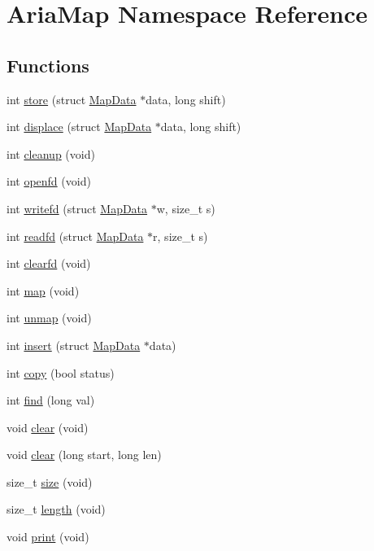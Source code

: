 \hypertarget{namespaceAriaMap}{}\section{Aria\+Map Namespace Reference}
\label{namespaceAriaMap}
\subsection*{Functions}
\begin{DoxyCompactItemize}
\item 
int \hyperlink{namespaceAriaMap_ab476269022f8048bbb7618a4830eeabd}{store} (struct \hyperlink{structMapData}{Map\+Data} $\ast$data, long shift)
\item 
int \hyperlink{namespaceAriaMap_aad25e1bc6cbd702fd569df804d90e464}{displace} (struct \hyperlink{structMapData}{Map\+Data} $\ast$data, long shift)
\item 
int \hyperlink{namespaceAriaMap_a0820778a918ad835c8b7b9dbd2b0ae9e}{cleanup} (void)
\item 
int \hyperlink{namespaceAriaMap_a7775ad4992d7a25a554896bc3ed5e4ce}{openfd} (void)
\item 
int \hyperlink{namespaceAriaMap_ae9ed69be092b57caff848ae611339adf}{writefd} (struct \hyperlink{structMapData}{Map\+Data} $\ast$w, size\+\_\+t s)
\item 
int \hyperlink{namespaceAriaMap_a85b66efeb9b3e717ea5c8ee3f72bec1a}{readfd} (struct \hyperlink{structMapData}{Map\+Data} $\ast$r, size\+\_\+t s)
\item 
int \hyperlink{namespaceAriaMap_a4f96bec0326c57c4fb11595fb5e48e52}{clearfd} (void)
\item 
int \hyperlink{namespaceAriaMap_a16dcceca67f06165428001241996ab14}{map} (void)
\item 
int \hyperlink{namespaceAriaMap_a05e8b260d9c410e0dec752d41e22dd98}{unmap} (void)
\item 
int \hyperlink{namespaceAriaMap_abde04797d8f7dca3a40b492d7e7788a6}{insert} (struct \hyperlink{structMapData}{Map\+Data} $\ast$data)
\item 
int \hyperlink{namespaceAriaMap_af2742e0765093c4fc620caaaa76c38bc}{copy} (bool status)
\item 
int \hyperlink{namespaceAriaMap_a9d3f96512f5841571994008631b27b48}{find} (long val)
\item 
void \hyperlink{namespaceAriaMap_a1ae3654679044db830871fa3b0d409f1}{clear} (void)
\item 
void \hyperlink{namespaceAriaMap_a16bcb7ece1c6912d7372d15f38b8057e}{clear} (long start, long len)
\item 
size\+\_\+t \hyperlink{namespaceAriaMap_a6e02547a1c5f23b8b520faaf4ac435d5}{size} (void)
\item 
size\+\_\+t \hyperlink{namespaceAriaMap_a234dc58cf6e47d321f7a9743fd2635ec}{length} (void)
\item 
void \hyperlink{namespaceAriaMap_a2c1667afce41963288cba56437c48df2}{print} (void)
\end{DoxyCompactItemize}


